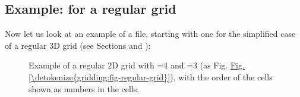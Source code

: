 \documentclass[letterpaper,10pt,english]{sphinxmanual}
\begin{document}
\subsection{Example:  for a regular grid}
\label{\detokenize{inputoutputfiles:example-dust-density-inp-for-a-regular-grid}}
Now let us look at an example of a  file,
starting with one for the simplified case of a regular 3\sphinxhyphen{}D grid (see
Sections {\hyperref[\detokenize{inputoutputfiles:sec-amr-grid-regular}]{}} and {\hyperref[\detokenize{gridding:sec-regular-grid}]{}}):

\begin{sphinxVerbatim}[commandchars=\\\{\}]
                                      
\PYG{p}{[}\PYG{p}{]}
\PYG{p}{[}\PYG{p}{]}
\PYG{p}{[}\PYG{p}{]}
\PYG{p}{[}\PYG{p}{]}
\PYG{p}{[}\PYG{p}{]}
\PYG{p}{[}\PYG{p}{]}
\PYG{p}{[}\PYG{p}{]}
\end{sphinxVerbatim}

\begin{figure}[htbp]
\centering
\capstart

\noindent{}
\caption{Example of a regular 2\sphinxhyphen{}D grid with =4 and =3 (as
Fig. \hyperref[\detokenize{gridding:fig-regular-grid}]{Fig.\@ \ref{\detokenize{gridding:fig-regular-grid}}}), with the order of the cells shown as
numbers in the cells.}\label{\detokenize{inputoutputfiles:id9}}\label{\detokenize{inputoutputfiles:fig-regular-grid-numbered}}\end{figure}
\end{document}
